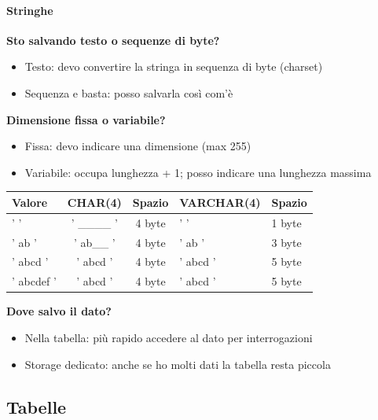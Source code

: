 \documentclass[12pt,a4paper]{article}
\begin{document}
\paragraph{Stringhe\\}
\textbf{Sto salvando testo o sequenze di byte?}\\
\begin{itemize}
\item Testo: devo convertire la stringa in sequenza di byte (charset)
\item Sequenza e basta: posso salvarla così com'è
\end{itemize}
\textbf{Dimensione fissa o variabile?}\\
\begin{itemize}
\item Fissa: devo indicare una dimensione (max 255)
\item Variabile: occupa lunghezza + 1; posso indicare una lunghezza massima
\end{itemize}
\begin{center}
\begin{tabular}{lccll}
\textbf{Valore} & \textbf{CHAR(4)} & \textbf{Spazio} & \textbf{VARCHAR(4)} & \textbf{Spazio}\\ \hline
' ' & ' \_\_\_\_ ' & 4 byte & ' ' & 1 byte\\ \hline
' ab ' & ' ab\_\_ ' & 4 byte & ' ab ' & 3 byte\\ \hline
' abcd ' & ' abcd ' & 4 byte & ' abcd ' & 5 byte\\ \hline
' abcdef ' & ' abcd ' & 4 byte & ' abcd ' & 5 byte\\ \hline
\end{tabular}
\end{center}
\textbf{Dove salvo il dato?}
\begin{itemize}
\item Nella tabella: più rapido accedere al dato per interrogazioni
\item Storage dedicato: anche se ho molti dati la tabella resta piccola
\end{itemize}

\subsection{Tabelle}
\end{document}
